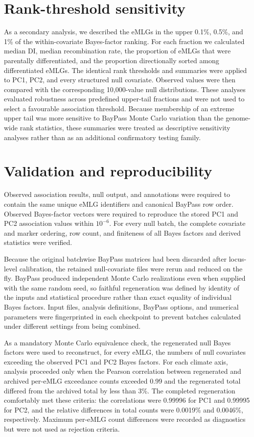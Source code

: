 \documentclass[11pt,a4paper]{article}
\begin{document}
\section{Rank-threshold sensitivity}

As a secondary analysis, we described the eMLGs in the upper 0.1\%, 0.5\%, and 1\% of the within-covariate Bayes-factor ranking. For each fraction we calculated median DI, median recombination rate, the proportion of eMLGs that were parentally differentiated, and the proportion directionally sorted among differentiated eMLGs. The identical rank thresholds and summaries were applied to PC1, PC2, and every structured null covariate. Observed values were then compared with the corresponding 10,000-value null distributions. These analyses evaluated robustness across predefined upper-tail fractions and were not used to select a favourable association threshold. Because membership of an extreme upper tail was more sensitive to BayPass Monte Carlo variation than the genome-wide rank statistics, these summaries were treated as descriptive sensitivity analyses rather than as an additional confirmatory testing family.

\section{Validation and reproducibility}

Observed association results, null output, and annotations were required to contain the same unique eMLG identifiers and canonical BayPass row order. Observed Bayes-factor vectors were required to reproduce the stored PC1 and PC2 association values within $10^{-6}$. For every null batch, the complete covariate and marker ordering, row count, and finiteness of all Bayes factors and derived statistics were verified.

Because the original batchwise BayPass matrices had been discarded after locus-level calibration, the retained null-covariate files were rerun and reduced on the fly. BayPass produced independent Monte Carlo realizations even when supplied with the same random seed, so faithful regeneration was defined by identity of the inputs and statistical procedure rather than exact equality of individual Bayes factors. Input files, analysis definitions, BayPass options, and numerical parameters were fingerprinted in each checkpoint to prevent batches calculated under different settings from being combined.

As a mandatory Monte Carlo equivalence check, the regenerated null Bayes factors were used to reconstruct, for every eMLG, the numbers of null covariates exceeding the observed PC1 and PC2 Bayes factors. For each climate axis, analysis proceeded only when the Pearson correlation between regenerated and archived per-eMLG exceedance counts exceeded 0.99 and the regenerated total differed from the archived total by less than 3\%. The completed regeneration comfortably met these criteria: the correlations were 0.99996 for PC1 and 0.99995 for PC2, and the relative differences in total counts were 0.0019\% and 0.0046\%, respectively. Maximum per-eMLG count differences were recorded as diagnostics but were not used as rejection criteria.
\end{document}
